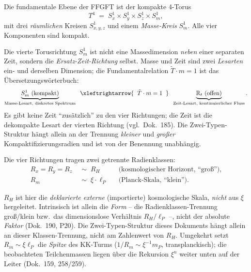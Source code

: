 \begin{definition}\label{def:t4}
Die fundamentale Ebene der FFGFT ist der kompakte 4-Torus
\[
  T^4 \;=\; S^1_x \times S^1_y \times S^1_z \times S^1_m ,
\]
mit drei \emph{r\"aumlichen} Kreisen $S^1_{x,y,z}$ und einem
\emph{Masse-Kreis} $S^1_m$. Alle vier Komponenten sind kompakt.
\end{definition}

\begin{remark}\label{bem:struktur}
Die vierte Torusrichtung $S^1_m$ ist nicht eine Massedimension \emph{neben}
einer separaten Zeit, sondern die \emph{Ersatz-Zeit-Richtung} selbst. Masse und
Zeit sind zwei \emph{Lesarten} ein- und derselben Dimension; die
Fundamentalrelation $\tilde{T}\cdot m = 1$ ist das \"Ubersetzungsw\"orterbuch:
\[
  \underbrace{S^1_m \text{ (kompakt)}}_{\text{Masse-Lesart, diskretes Spektrum}}
  \;\;\xleftrightarrow{\;\;\tilde{T}\cdot m = 1\;\;}\;\;
  \underbrace{\mathbb{R}_t \text{ (offen)}}_{\text{Zeit-Lesart, kontinuierlicher Fluss}}.
\]
Es gibt keine Zeit ``zus\"atzlich'' zu den vier Richtungen; die Zeit ist die
dekompakte Lesart der vierten Richtung (vgl.\ Dok.~185). Die Zwei-Typen-Struktur
h\"angt allein an der Trennung \emph{kleiner} und \emph{gro\ss er}
Kompaktifizierungsradien und ist von der Benennung unabh\"angig.
\end{remark}

Die vier Richtungen tragen zwei getrennte Radienklassen:
\begin{align}
  R_x = R_y = R_z &\;\sim\; R_H
  && \text{(kosmologischer Horizont, ``gro\ss '')},\\
  R_m &\;\sim\; \xi \cdot \ell_P
  && \text{(Planck-Skala, ``klein'')}.
\end{align}

\begin{remark}\label{bem:skalen}
$R_H$ ist hier die \emph{deklarierte externe} (importierte) kosmologische Skala,
\emph{nicht} aus $\xi$ hergeleitet. Intrinsisch ist allein die \emph{Form} -- die
Radienklassen-Trennung gro\ss/klein bzw.\ das dimensionslose Verh\"altnis
$R_H/\ell_P$ --, nicht der absolute \emph{Faktor} (Dok.~190, P20). Die
Zwei-Typen-Struktur dieses Dokuments h\"angt allein an dieser Klassen-Trennung,
nicht am Zahlenwert von $R_H$. Umgekehrt setzt $R_m\sim\xi\ell_P$ die \emph{Spitze}
des KK-Turms ($1/R_m\sim\xi^{-1}m_P$, transplanckisch); die beobachteten
Teilchenmassen liegen \"uber die Rekursion $\xi^n$ weiter unten auf der Leiter
(Dok.~159, 258/259).
\end{remark}

